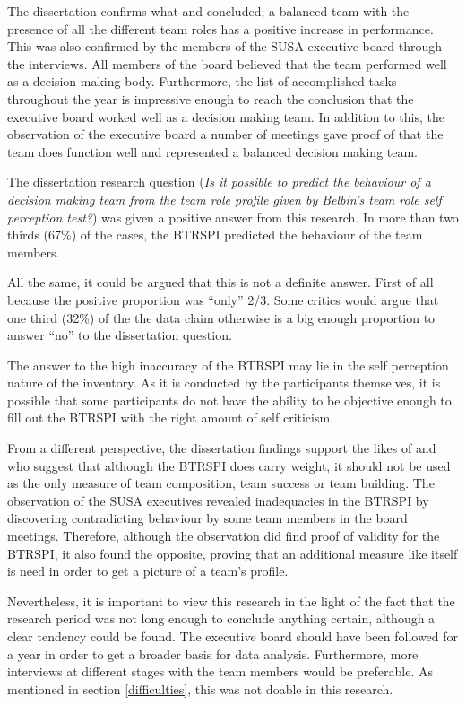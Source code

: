 \documentclass[a4paper,12pt,titlepage]{report}
\begin{document}
  The dissertation confirms what \citet[11]{cj} and \citet[652]{jpns}
  concluded; a balanced team with the presence of all the different team
  roles has a positive increase in performance.
  This was also confirmed by the members of the SUSA executive board through
  the interviews. All members of the board believed
  that the team performed well as a decision making body. Furthermore, the
  list of accomplished tasks throughout the year is impressive enough to reach
  the conclusion that the executive board worked well as a decision making
  team. In addition to this, the observation of the executive board a
  number of meetings gave proof of that the team does function well and
  represented a balanced decision making team.

  The dissertation research question (\emph{Is it possible to predict the behaviour of a decision making team from the team role profile given by Belbin's team role self perception test?}) was given a positive answer from this research. In more than
  two thirds (67\%) of the cases, the BTRSPI predicted the behaviour of the team
  members.

  All the same, it could be argued that this is not a definite answer.
  First of all because the positive proportion was ``only'' 2/3.
  Some critics would argue that one third (32\%) of the
  the data claim otherwise is a big enough proportion to answer ``no'' to
  the dissertation question.

  The answer to the high inaccuracy of the BTRSPI may lie in the self perception
  nature of the inventory. As it is conducted by the participants themselves,
  it is possible that some participants do not have the ability to be objective enough
  to fill out the BTRSPI with the right amount of self criticism.

  From a different perspective, the dissertation findings
  support the likes of \citet{sfwmgs} and \citet{sfwmjw}
  who suggest that although the BTRSPI does carry weight, it should not be used as
  the only measure of team composition, team success or team building. 
  The observation of the SUSA executives revealed inadequacies in
  the BTRSPI by discovering contradicting behaviour by some team members in
  the board meetings. Therefore, although the observation did find proof of validity
  for the BTRSPI, it also found the opposite, proving that an additional measure
  like itself is need in order to get a picture of a team's profile.

  Nevertheless, it is important to view this research in
  the light of the fact that the
  research period was not long enough to conclude anything certain, although a clear
  tendency could be found. The executive board should have been followed for a
  year in order to get a broader basis for data analysis. Furthermore, more interviews
  at different stages with the team members would be preferable. As mentioned in
  section \ref{difficulties}, this was not doable in this research. 
\end{document}
